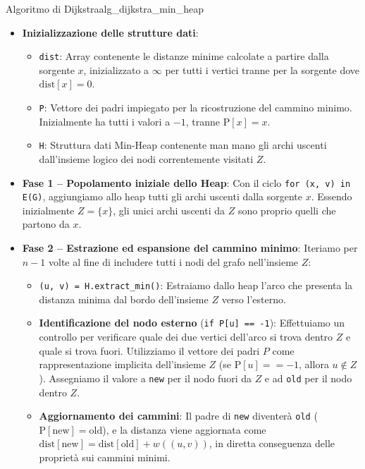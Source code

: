 \documentclass[12pt]{report}
\begin{document}
	\begin{algoritmo}{Algoritmo di Dijkstra}{alg_dijkstra_min_heap}
		\begin{itemize}
			\item \textbf{Inizializzazione delle strutture dati}:
			\begin{itemize}
				\item \texttt{dist}: Array contenente le distanze minime calcolate a partire dalla sorgente $x$, inizializzato a $\infty$ per tutti i vertici tranne per la sorgente dove $\text{dist}[x] = 0$.
				\item \texttt{P}: Vettore dei padri impiegato per la ricostruzione del cammino minimo. Inizialmente ha tutti i valori a $-1$, tranne $\text{P}[x] = x$.
				\item \texttt{H}: Struttura dati Min-Heap contenente man mano gli archi uscenti dall'insieme logico dei nodi correntemente visitati $Z$.
			\end{itemize}
			
			\item \textbf{Fase 1 -- Popolamento iniziale dello Heap}:
			Con il ciclo \texttt{for (x, v) in E(G)}, aggiungiamo allo heap tutti gli archi uscenti dalla sorgente $x$. Essendo inizialmente $Z = \{x\}$, gli unici archi uscenti da $Z$ sono proprio quelli che partono da $x$.
			
			\item \textbf{Fase 2 -- Estrazione ed espansione del cammino minimo}:
			Iteriamo per $n - 1$ volte al fine di includere tutti i nodi del grafo nell'insieme $Z$:
			\begin{itemize}
				\item \texttt{(u, v) = H.extract\_min()}: Estraiamo dallo heap l'arco che presenta la distanza minima dal bordo dell'insieme $Z$ verso l'esterno.
				\item \textbf{Identificazione del nodo esterno} (\texttt{if P[u] == -1}): Effettuiamo un controllo per verificare quale dei due vertici dell'arco si trova dentro $Z$ e quale si trova fuori. Utilizziamo il vettore dei padri $P$ come rappresentazione implicita dell'insieme $Z$ (se $\text{P}[u] == -1$, allora $u \notin Z$). Assegniamo il valore a \texttt{new} per il nodo fuori da $Z$ e ad \texttt{old} per il nodo dentro $Z$.
				\item \textbf{Aggiornamento dei cammini}: Il padre di \texttt{new} diventerà \texttt{old} ($\text{P}[\text{new}] = \text{old}$), e la distanza viene aggiornata come $\text{dist}[\text{new}] = \text{dist}[\text{old}] + w((u, v))$, in diretta conseguenza delle proprietà sui cammini minimi.
			\end{itemize}
			

\end{itemize}
\end{algoritmo}
\end{document}
